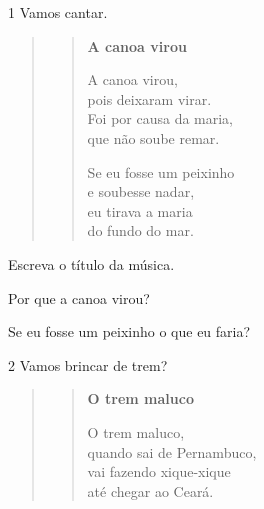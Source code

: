 
\num{1} Vamos cantar.


\begin{quote}
\begin{verse}
\textbf{A canoa virou}

A canoa virou,\\
pois deixaram virar.\\
Foi por causa da maria,\\
que não soube remar.

Se eu fosse um peixinho\\
e soubesse nadar,\\
eu tirava a maria\\
do fundo do mar.
\end{verse}

\end{quote}

\begin{escolha}
\item Escreva o título da música.


\item Por que a canoa virou?


\item Se eu fosse um peixinho o que eu faria?

\end{escolha}

\num{2} Vamos brincar de trem?


\begin{quote}
\begin{verse}
\textbf{O trem maluco}

O trem maluco,\\
quando sai de Pernambuco,\\
vai fazendo xique-xique\\
até chegar ao Ceará.
\end{verse}
\end{quote}

